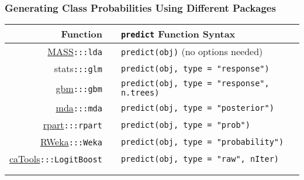 \documentclass[12 pt]{beamer}\usepackage[]{graphicx}\usepackage[]{color}
\newcommand{\hlstr}[1]{\textcolor[rgb]{0.063,0.58,0.627}{#1}}%
\newcommand{\hlstd}[1]{\textcolor[rgb]{0.196,0.196,0.196}{#1}}%
\newcommand{\hlkwc}[1]{\textcolor[rgb]{0,0.631,0.314}{#1}}%
\newcommand{\hlkwd}[1]{\textcolor[rgb]{0.78,0.227,0.412}{#1}}%
\newcommand{\pkg}[1]{{\fontseries{b}\selectfont #1}}
\renewcommand{\pkg}[1]{{\color{darkgreen}\textsf{#1}}}
\begin{document}
  \begin{frame}[fragile]
\frametitle{Generating Class Probabilities Using Different Packages}

\begin{footnotesize}
\begin{center}
\begin{tabular}{rcl}
{\bf Function} && {\bf {\tt predict} Function Syntax} \\
\hline
 \href{http://cran.r-project.org/web/packages/MASS/index.html}{\pkg{MASS}}\texttt{:::lda} && {\tt \hlkwd{predict}\hlstd{(obj)}} (no options needed)\\
\pkg{stats}\texttt{:::glm} && {\tt \hlkwd{predict}\hlstd{(obj,} \hlkwc{type} \hlstd{=} \hlstr{"response"}\hlstd{)}} \\
\href{http://cran.r-project.org/web/packages/gbm/index.html}{\pkg{gbm}}\texttt{:::gbm} && {\tt \hlkwd{predict}\hlstd{(obj,} \hlkwc{type} \hlstd{=} \hlstr{"response"}\hlstd{, n.trees)}} \\
\href{http://cran.r-project.org/web/packages/mda/index.html}{\pkg{mda}}\texttt{:::mda} && {\tt \hlkwd{predict}\hlstd{(obj,} \hlkwc{type} \hlstd{=} \hlstr{"posterior"}\hlstd{)}} \\  
\href{http://cran.r-project.org/web/packages/rpart/index.html}{\pkg{rpart}}\texttt{:::rpart} && {\tt \hlkwd{predict}\hlstd{(obj,} \hlkwc{type} \hlstd{=} \hlstr{"prob"}\hlstd{)}}   \\
\href{http://cran.r-project.org/web/packages/RWeka/index.html}{\pkg{RWeka}}\texttt{:::Weka} && {\tt \hlkwd{predict}\hlstd{(obj,} \hlkwc{type} \hlstd{=} \hlstr{"probability"}\hlstd{)}}  \\    
\href{http://cran.r-project.org/web/packages/caTools/index.html}{\pkg{caTools}}\texttt{:::LogitBoost}  && {\tt \hlkwd{predict}\hlstd{(obj,} \hlkwc{type} \hlstd{=}  \hlstr{"raw"}\hlstd{, nIter)}} \\
\hline \\
\\
\end{tabular}
\end{center}
\end{footnotesize}
\end{frame}

  
\end{document}
